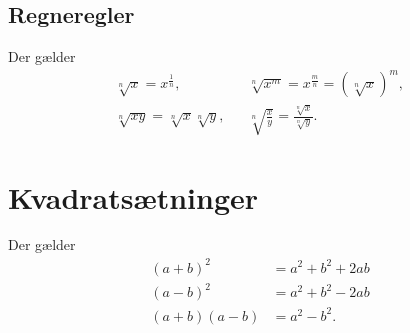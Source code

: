 \subsection{Regneregler}
Der gælder
\begin{align*}
\sqrt[n]{x}=x^{\frac{1}{n}},&& \sqrt[n]{x^m}=x^{\frac{m}{n}}=(\sqrt[n]{x})^m,\\
\sqrt[n]{xy}=\sqrt[n]{x}\sqrt[n]{y},&& \sqrt[n]{\frac{x}{y}}=\frac{\sqrt[n]{x}}{\sqrt[n]{y}}.
\end{align*}

\section{Kvadratsætninger}
Der gælder
\begin{align*}
(a+b)^2&=a^2+b^2+2ab\\
(a-b)^2&=a^2+b^2-2ab\\
(a+b)(a-b)&=a^2-b^2.
\end{align*}